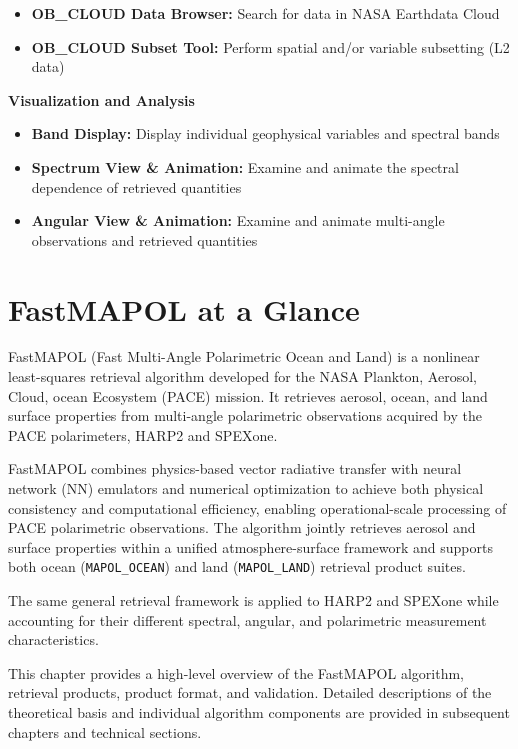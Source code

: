 \documentclass[
  11pt,
  letterpaper,
]{scrreprt}
\providecommand{\tightlist}{%
  \setlength{\itemsep}{0pt}\setlength{\parskip}{0pt}}
\begin{document}
\begin{itemize}
\tightlist
\item
  \textbf{OB\_CLOUD Data Browser:} Search for data in NASA Earthdata
  Cloud
\item
  \textbf{OB\_CLOUD Subset Tool:} Perform spatial and/or variable
  subsetting (L2 data)
\end{itemize}

\textbf{Visualization and Analysis}

\begin{itemize}
\tightlist
\item
  \textbf{Band Display:} Display individual geophysical variables and
  spectral bands
\item
  \textbf{Spectrum View \& Animation:} Examine and animate the spectral
  dependence of retrieved quantities
\item
  \textbf{Angular View \& Animation:} Examine and animate multi-angle
  observations and retrieved quantities
\end{itemize}


\chapter{FastMAPOL at a Glance}\label{fastmapol-at-a-glance}

FastMAPOL (Fast Multi-Angle Polarimetric Ocean and Land) is a nonlinear
least-squares retrieval algorithm developed for the NASA Plankton,
Aerosol, Cloud, ocean Ecosystem (PACE) mission. It retrieves aerosol,
ocean, and land surface properties from multi-angle polarimetric
observations acquired by the PACE polarimeters, HARP2 and SPEXone.

FastMAPOL combines physics-based vector radiative transfer with neural
network (NN) emulators and numerical optimization to achieve both
physical consistency and computational efficiency, enabling
operational-scale processing of PACE polarimetric observations. The
algorithm jointly retrieves aerosol and surface properties within a
unified atmosphere-surface framework and supports both ocean
(\texttt{MAPOL\_OCEAN}) and land (\texttt{MAPOL\_LAND}) retrieval
product suites.

The same general retrieval framework is applied to HARP2 and SPEXone
while accounting for their different spectral, angular, and polarimetric
measurement characteristics.

This chapter provides a high-level overview of the FastMAPOL algorithm,
retrieval products, product format, and validation. Detailed
descriptions of the theoretical basis and individual algorithm
components are provided in subsequent chapters and technical sections.
\end{document}
